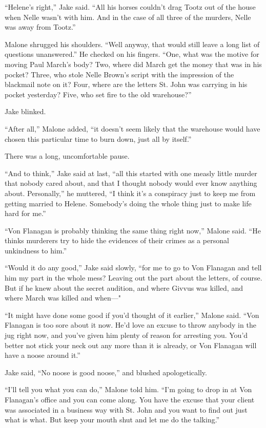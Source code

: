 \documentclass{novel}
\begin{document}
“Helene’s right,” Jake said. “All his horses couldn’t drag Tootz out of the house when Nelle wasn’t with him. And in the case of all three of the murders, Nelle was away from Tootz.”

Malone shrugged his shoulders. “Well anyway, that would still leave a long list of questions unanswered.” He checked on his fingers. “One, what was the motive for moving Paul March’s body? Two, where did March get the money that was in his pocket? Three, who stole Nelle Brown’s script with the impression of the blackmail note on it? Four, where are the letters St. John was carrying in his pocket yesterday? Five, who set fire to the old warehouse?”

Jake blinked.

“After all,” Malone added, “it doesn’t seem likely that the warehouse would have chosen this particular time to burn down, just all by itself.”

There was a long, uncomfortable pause.

“And to think,” Jake said at last, “all this started with one measly little murder that nobody cared about, and that I thought nobody would ever know anything about. Personally,” he muttered, “I think it’s a conspiracy just to keep me from getting married to Helene. Somebody’s doing the whole thing just to make life hard for me.”

“Von Flanagan is probably thinking the same thing right now,” Malone said. “He thinks murderers try to hide the evidences of their crimes as a personal unkindness to him.”

“Would it do any good,” Jake said slowly, “for me to go to Von Flanagan and tell him my part in the whole mess? Leaving out the part about the letters, of course. But if he knew about the secret audition, and where Givvus was killed, and where March was killed and when—"

“It might have done some good if you’d thought of it earlier,” Malone said. “Von Flanagan is too sore about it now. He’d love an excuse to throw anybody in the jug right now, and you’ve given him plenty of reason for arresting you. You’d better not stick your neck out any more than it is already, or Von Flanagan will have a noose around it.”

Jake said, “No noose is good noose,” and blushed apologetically.

“I’ll tell you what you can do,” Malone told him. “I’m going to drop in at Von Flanagan’s office and you can come along. You have the excuse that your client was associated in a business way with St. John and you want to find out just what is what. But keep your mouth shut and let me do the talking.”
\end{document}
